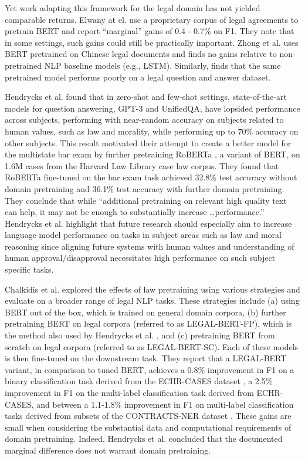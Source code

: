 \documentclass[sigconf]{acmart}
\begin{document}
Yet work adapting this framework for the legal domain has not yielded comparable returns. Elwany at el. \cite{Elwany2019} use a proprietary corpus of legal agreements to pretrain BERT and report  ``marginal'' gains of 0.4 - 0.7\% on F1.  They note that in some settings, such gains could still be practically important.  Zhong et al. \cite{zhong2020does} uses BERT pretrained on Chinese legal documents and finds no gains relative to non-pretrained NLP baseline models (e.g., LSTM).  Similarly, \cite{zhong2020jec} finds that the same pretrained model performs poorly on a legal question and answer dataset.  

Hendrycks et al. \cite{hendrycks2021measuring} found that in zero-shot and few-shot settings, state-of-the-art models for question answering, GPT-3 and UnifiedQA, have lopsided performance across subjects, performing with near-random accuracy on subjects related to human values, such as law and morality, while performing up to 70\% accuracy on other subjects. This result motivated their attempt to create a better model for the multistate bar exam by further pretraining RoBERTa \cite{liu2019roberta}, a variant of BERT, on 1.6M cases from the Harvard Law Library case law corpus. They found that RoBERTa fine-tuned on the bar exam  task achieved 32.8\% test accuracy without domain pretraining and 36.1\% test accuracy with further domain pretraining. They conclude that while ``additional pretraining on relevant high quality text can help, it may not be enough to substantially
increase \dots performance.'' 
Hendrycks et al. \cite{hendrycks2021aligning} highlight that future research should especially aim to increase language model performance on tasks in subject areas such as law and moral reasoning since aligning future systems with human values and understanding of human approval/disapproval necessitates high performance on such subject specific tasks.

Chalkidis et al. \cite{chalkidis-etal-2020-legal} explored the effects of law pretraining using various strategies and evaluate on a broader range of legal NLP tasks. These strategies include (a) using BERT out of the box, which is trained on general domain corpora, (b) further pretraining BERT on legal corpora (referred to as LEGAL-BERT-FP), which is the method also used by Hendrycks et al. \cite{hendrycks2021measuring}, and (c) pretraining BERT from scratch on legal corpora (referred to as LEGAL-BERT-SC). Each of these models is then fine-tuned on the downstream task. They report that a LEGAL-BERT variant, in comparison to tuned BERT, achieves a 0.8\% improvement in F1 on a binary classification task derived from the ECHR-CASES dataset \cite{chalkidis-etal-2019-neural}, a 2.5\% improvement in F1 on the multi-label classification task derived from ECHR-CASES, and between a 1.1-1.8\% improvement in F1 on multi-label classification tasks derived from subsets of the CONTRACTS-NER dataset \cite{10.1145/3086512.3086515, chalkidis2019neural}.  These gains are small when considering the substantial data and computational requirements of domain pretraining. Indeed, Hendrycks et al. \cite{hendrycks2021measuring} concluded that the documented marginal difference does not warrant domain pretraining. 
\end{document}
